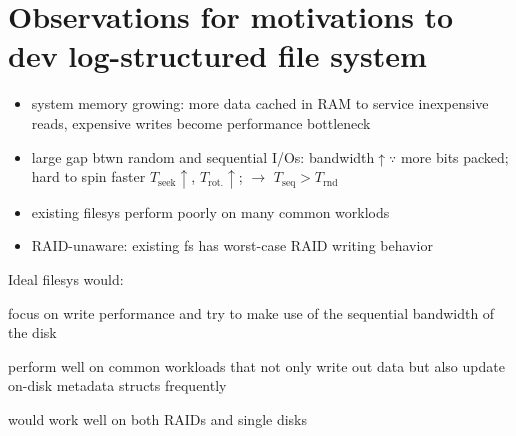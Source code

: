 \section*{Observations for motivations to dev log-structured file system}
\begin{itemize}
\item system memory growing: more data cached in RAM to service inexpensive reads, expensive writes become performance bottleneck
\item large gap btwn random and sequential I/Os: bandwidth$\uparrow\because$ more bits packed; hard to spin faster $T_{\text{seek}}\uparrow$, $T_{\text{rot.}}\uparrow$; $\to$ $T_{\text{seq}} > T_{\text{rnd}}$
\item existing filesys perform poorly on many common worklods
\item RAID-unaware: existing fs has worst-case RAID writing behavior
\end{itemize}
Ideal filesys would:
\begin{enumerate*}[label={\arabic*.},font={\color{red!50!black}\bfseries}]
\item focus on write performance and try to make use of the sequential bandwidth of the disk
\item perform well on common workloads that not only write out data but also
update on-disk metadata structs frequently
\item would work well on both RAIDs and single disks
\end{enumerate*}
